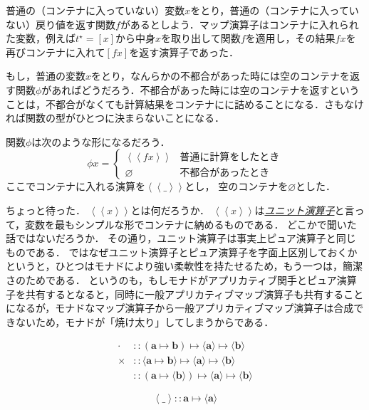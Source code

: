 \documentclass[a4paper]{jsbook}
\newcommand{\keyword}[1]{{\underline{\emph{#1}}}}
\newcommand{\mList}[1]{{#1}^\mathrm{\star}}
\newcommand{\mathTypeParameter}[1]{\mathbf{#1}}
\newcommand{\mathPureWith}[1]{\left\langle#1\right\rangle}
\newcommand{\mathUnitWith}[1]{\left\langle\!\left\langle#1\right\rangle\!\right\rangle}
\newcommand{\mathPureNothing}{\varnothing}
\newcommand{\mathAny}{\_}
\newcommand{\mathApplicativeGeneralMap}{\mathbin{\times}}
\newcommand{\mathGeneralMap}{\mathbin{\cdot}}
\newcommand{\mathIn}{\mathrel{::}}
\newcommand{\mathMapsTo}{\mapsto}
\newcommand{\mathMorph}[2]{#1\mathMapsTo#2}
\newcommand{\mathMorphII}[3]{#1\mathMapsTo#2\mathMapsTo#3}
\DeclareMathOperator{\hsklMonadMap}{{DO NOT USE}--\heartsuit}
\begin{document}
普通の（コンテナに入っていない）変数$x$をとり，普通の（コンテナに入っていない）戻り値を返す関数$f$があるとしよう．マップ演算子はコンテナに入れられた変数，例えば$\mList{t}=[x]$から中身$x$を取り出して関数$f$を適用し，その結果$fx$を再びコンテナに入れて$[fx]$を返す演算子であった．

もし，普通の変数$x$をとり，なんらかの不都合があった時には空のコンテナを返す関数$\phi$があればどうだろう．不都合があった時には空のコンテナを返すということは，不都合がなくても計算結果をコンテナにに詰めることになる．さもなければ関数の型がひとつに決まらないことになる．

関数$\phi$は次のような形になるだろう．
$$\phi x=\begin{cases}\mathUnitWith{fx}&\text{普通に計算をしたとき}\\
\mathPureNothing&\text{不都合があったとき}\end{cases}$$
ここでコンテナに入れる演算を$\mathUnitWith{\mathAny}$とし，
空のコンテナを$\mathPureNothing$とした．

ちょっと待った．
$\mathUnitWith{x}$とは何だろうか．
$\mathUnitWith{x}$は\keyword{ユニット演算子}と言って，変数を最もシンプルな形でコンテナに納めるものである．
どこかで聞いた話ではないだろうか．
その通り，ユニット演算子は事実上ピュア演算子と同じものである．
ではなぜユニット演算子とピュア演算子を字面上区別しておくかというと，ひとつはモナドにより強い柔軟性を持たせるため，もう一つは，簡潔さのためである．
というのも，もしモナドがアプリカティブ関手とピュア演算子を共有するとなると，同時に一般アプリカティブマップ演算子も共有することになるが，モナドなマップ演算子から一般アプリカティブマップ演算子は合成できないため，モナドが「焼け太り」してしまうからである．

\begin{align*}
\mathGeneralMap&\mathIn{}\mathMorphII{(\mathMorph{\mathTypeParameter{a}}{\mathTypeParameter{b}})}{\langle\mathTypeParameter{a}\rangle}{\langle\mathTypeParameter{b}
\rangle}\\
\mathApplicativeGeneralMap&\mathIn{}\mathMorphII{\langle\mathMorph{\mathTypeParameter{a}}{\mathTypeParameter{b}}\rangle}{\langle\mathTypeParameter{a}\rangle}{\langle\mathTypeParameter{b}\rangle}\\
\hsklMonadMap&\mathIn{}\mathMorphII{(\mathMorph{\mathTypeParameter{a}}{\langle\mathTypeParameter{b}\rangle})}{\langle\mathTypeParameter{a}\rangle}{\langle{\mathTypeParameter{b}}\rangle}
\end{align*}

$$\mathPureWith{\mathAny}\mathIn\mathMorph{\mathTypeParameter{a}}{\langle\mathTypeParameter{a}\rangle}$$
\end{document}
